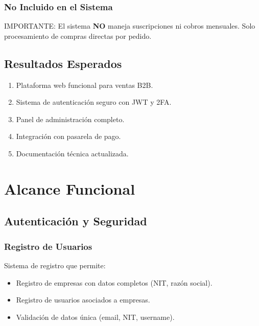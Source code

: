 \documentclass[12pt,a4paper,oneside]{book}
\begin{document}
\subsection{No Incluido en el Sistema}
\begin{alert}{IMPORTANTE:} El sistema \textbf{NO} maneja suscripciones ni cobros mensuales. 
Solo procesamiento de compras directas por pedido.

\section{Resultados Esperados}
\begin{enumerate}
    \item Plataforma web funcional para ventas B2B.
    \item Sistema de autenticación seguro con JWT y 2FA.
    \item Panel de administración completo.
    \item Integración con pasarela de pago.
    \item Documentación técnica actualizada.
\end{enumerate}

\chapter{Alcance Funcional}
\label{cap:alcance}

\section{Autenticación y Seguridad}
\label{sec:autenticacion}

\subsection{Registro de Usuarios}
Sistema de registro que permite:
\begin{itemize}
    \item Registro de empresas con datos completos (NIT, razón social).
    \item Registro de usuarios asociados a empresas.
    \item Validación de datos única (email, NIT, username).
\end{itemize}


\end{alert}
\end{document}
